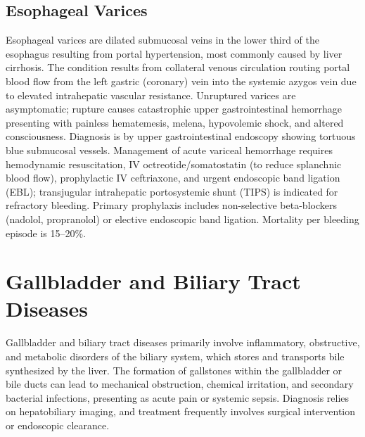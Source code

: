 \subsection{Esophageal Varices}
\label{sec:Esophageal Varices}
Esophageal varices are dilated submucosal veins in the lower third of the esophagus resulting from portal hypertension, most commonly caused by liver cirrhosis. The condition results from collateral venous circulation routing portal blood flow from the left gastric (coronary) vein into the systemic azygos vein due to elevated intrahepatic vascular resistance. Unruptured varices are asymptomatic; rupture causes catastrophic upper gastrointestinal hemorrhage presenting with painless hematemesis, melena, hypovolemic shock, and altered consciousness. Diagnosis is by upper gastrointestinal endoscopy showing tortuous blue submucosal vessels. Management of acute variceal hemorrhage requires hemodynamic resuscitation, IV octreotide/somatostatin (to reduce splanchnic blood flow), prophylactic IV ceftriaxone, and urgent endoscopic band ligation (EBL); transjugular intrahepatic portosystemic shunt (TIPS) is indicated for refractory bleeding. Primary prophylaxis includes non-selective beta-blockers (nadolol, propranolol) or elective endoscopic band ligation. Mortality per bleeding episode is 15--20\%.


\section{Gallbladder and Biliary Tract Diseases}




Gallbladder and biliary tract diseases primarily involve inflammatory, obstructive, and metabolic disorders of the biliary system, which stores and transports bile synthesized by the liver. The formation of gallstones within the gallbladder or bile ducts can lead to mechanical obstruction, chemical irritation, and secondary bacterial infections, presenting as acute pain or systemic sepsis. Diagnosis relies on hepatobiliary imaging, and treatment frequently involves surgical intervention or endoscopic clearance.


